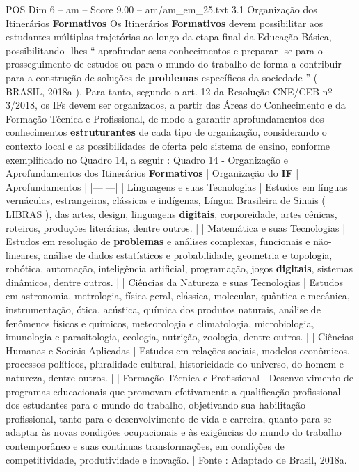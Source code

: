 \begin{textsample}{POS Dim 6 – am – Score 9.00 – am/am\_em\_25.txt}  \label{ex:f6_pos_265}
3.1 Organização dos Itinerários \textbf{Formativos} Os Itinerários \textbf{Formativos} devem possibilitar aos estudantes múltiplas trajetórias ao longo da etapa final da Educação Básica, possibilitando -lhes “ aprofundar seus conhecimentos e preparar -se para o prosseguimento de estudos ou para o mundo do trabalho de forma a contribuir para a construção de soluções de \textbf{problemas} específicos da sociedade ” ( BRASIL, 2018a ).
Para tanto, segundo o art. 12 da Resolução CNE/CEB nº 3/2018, os IFs devem ser organizados, a partir das Áreas do Conhecimento e da Formação Técnica e Profissional, de modo a garantir aprofundamentos dos conhecimentos \textbf{estruturantes} de cada tipo de organização, considerando o contexto local e as possibilidades de oferta pelo sistema de ensino, conforme exemplificado no Quadro 14, a seguir : Quadro 14 - Organização e Aprofundamentos dos Itinerários \textbf{Formativos} | Organização do \textbf{IF} | Aprofundamentos | |---|---| | Linguagens e suas Tecnologias | Estudos em línguas vernáculas, estrangeiras, clássicas e indígenas, Língua Brasileira de Sinais ( LIBRAS ), das artes, design, linguagens \textbf{digitais}, corporeidade, artes cênicas, roteiros, produções literárias, dentre outros. | | Matemática e suas Tecnologias | Estudos em resolução de \textbf{problemas} e análises complexas, funcionais e não-lineares, análise de dados estatísticos e probabilidade, geometria e topologia, robótica, automação, inteligência artificial, programação, jogos \textbf{digitais}, sistemas dinâmicos, dentre outros. | | Ciências da Natureza e suas Tecnologias | Estudos em astronomia, metrologia, física geral, clássica, molecular, quântica e mecânica, instrumentação, ótica, acústica, química dos produtos naturais, análise de fenômenos físicos e químicos, meteorologia e climatologia, microbiologia, imunologia e parasitologia, ecologia, nutrição, zoologia, dentre outros. | | Ciências Humanas e Sociais Aplicadas | Estudos em relações sociais, modelos econômicos, processos políticos, pluralidade cultural, historicidade do universo, do homem e natureza, dentre outros. | | Formação Técnica e Profissional | Desenvolvimento de programas educacionais que promovam efetivamente a qualificação profissional dos estudantes para o mundo do trabalho, objetivando sua habilitação profissional, tanto para o desenvolvimento de vida e carreira, quanto para se adaptar às novas condições ocupacionais e às exigências do mundo do trabalho contemporâneo e suas contínuas transformações, em condições de competitividade, produtividade e inovação. | Fonte : Adaptado de Brasil, 2018a.

\end{textsample}
